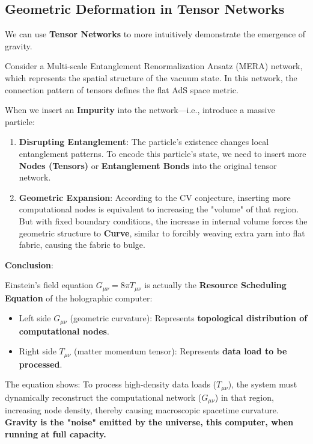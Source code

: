 \subsection{Geometric Deformation in Tensor Networks}

We can use \textbf{Tensor Networks} to more intuitively demonstrate the emergence of gravity.

Consider a Multi-scale Entanglement Renormalization Ansatz (MERA) network, which represents the spatial structure of the vacuum state. In this network, the connection pattern of tensors defines the flat AdS space metric.

When we insert an \textbf{Impurity} into the network—i.e., introduce a massive particle:

\begin{enumerate}
\item \textbf{Disrupting Entanglement}: The particle's existence changes local entanglement patterns. To encode this particle's state, we need to insert more \textbf{Nodes (Tensors)} or \textbf{Entanglement Bonds} into the original tensor network.

\item \textbf{Geometric Expansion}: According to the CV conjecture, inserting more computational nodes is equivalent to increasing the "volume" of that region. But with fixed boundary conditions, the increase in internal volume forces the geometric structure to \textbf{Curve}, similar to forcibly weaving extra yarn into flat fabric, causing the fabric to bulge.
\end{enumerate}

\textbf{Conclusion}:

Einstein's field equation $G_{\mu\nu} = 8\pi T_{\mu\nu}$ is actually the \textbf{Resource Scheduling Equation} of the holographic computer:

\begin{itemize}
\item Left side $G_{\mu\nu}$ (geometric curvature): Represents \textbf{topological distribution of computational nodes}.

\item Right side $T_{\mu\nu}$ (matter momentum tensor): Represents \textbf{data load to be processed}.
\end{itemize}

The equation shows: To process high-density data loads ($T_{\mu\nu}$), the system must dynamically reconstruct the computational network ($G_{\mu\nu}$) in that region, increasing node density, thereby causing macroscopic spacetime curvature. \textbf{Gravity is the "noise" emitted by the universe, this computer, when running at full capacity.}
